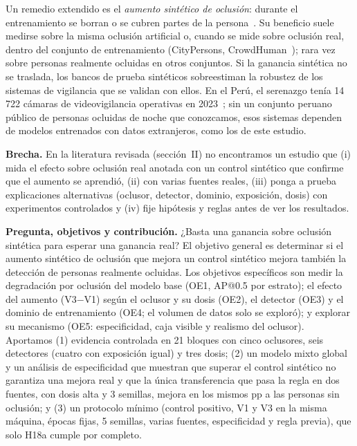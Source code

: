 \documentclass[conference]{IEEEtran}
\begin{document}
Un remedio extendido es el \emph{aumento sintético de oclusión}: durante el entrenamiento se borran o se cubren partes de la persona~\cite{Zhong2020,Shang2018synthocc,Chi2020pedhunter}. Su beneficio suele medirse sobre la misma oclusión artificial o, cuando se mide sobre oclusión real, dentro del conjunto de entrenamiento (CityPersons, CrowdHuman~\cite{Shao2018crowdhuman}); rara vez sobre personas realmente ocluidas en otros conjuntos. Si la ganancia sintética no se traslada, los bancos de prueba sintéticos sobreestiman la robustez de los sistemas de vigilancia que se validan con ellos. En el Perú, el serenazgo tenía 14\,722 cámaras de videovigilancia operativas en 2023~\cite{INEI2024renamu}; sin un conjunto peruano público de personas ocluidas de noche que conozcamos, esos sistemas dependen de modelos entrenados con datos extranjeros, como los de este estudio.

\textbf{Brecha.} En la literatura revisada (sección~II) no encontramos un estudio que (i) mida el efecto sobre oclusión real anotada con un control sintético que confirme que el aumento se aprendió, (ii) con varias fuentes reales, (iii) ponga a prueba explicaciones alternativas (oclusor, detector, dominio, exposición, dosis) con experimentos controlados y (iv) fije hipótesis y reglas antes de ver los resultados.

\textbf{Pregunta, objetivos y contribución.} ¿Basta una ganancia sobre oclusión sintética para esperar una ganancia real? El objetivo general es determinar si el aumento sintético de oclusión que mejora un control sintético mejora también la detección de personas realmente ocluidas. Los objetivos específicos son medir la degradación por oclusión del modelo base (OE1, AP@0.5 por estrato); el efecto del aumento (V3$-$V1) según el oclusor y su dosis (OE2), el detector (OE3) y el dominio de entrenamiento (OE4; el volumen de datos solo se exploró); y explorar su mecanismo (OE5: especificidad, caja visible y realismo del oclusor). Aportamos (1) evidencia controlada en 21 bloques con cinco oclusores, seis detectores (cuatro con exposición igual) y tres dosis; (2) un modelo mixto global y un análisis de especificidad que muestran que superar el control sintético no garantiza una mejora real y que la única transferencia que pasa la regla en dos fuentes, con dosis alta y 3 semillas, mejora en los mismos pp a las personas sin oclusión; y (3) un protocolo mínimo (control positivo, V1 y V3 en la misma máquina, épocas fijas, 5 semillas, varias fuentes, especificidad y regla previa), que solo H18a cumple por completo.
\end{document}
